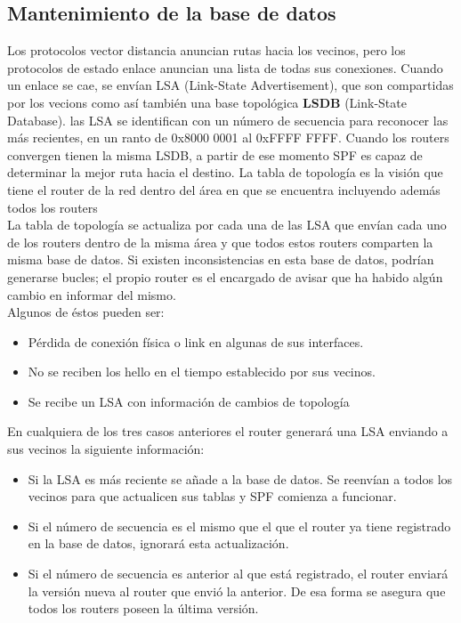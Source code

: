 \documentclass[12pt]{article}
\begin{document}
\subsection{Mantenimiento de la base de datos}
Los protocolos vector distancia anuncian rutas hacia los vecinos, pero los protocolos de estado enlace anuncian una lista de todas sus conexiones. Cuando un enlace se cae, se envían LSA (Link-State Advertisement), que son compartidas por los vecions como así también una base topológica \textbf{LSDB} (Link-State Database).  las LSA se identifican con un número de secuencia para reconocer las más recientes, en un ranto de 0x8000 0001 al 0xFFFF FFFF. Cuando los routers convergen tienen la misma LSDB, a partir de ese momento SPF es capaz de determinar la mejor ruta hacia el destino. La tabla de topología es la visión que tiene el router de la red dentro del área en que se encuentra incluyendo además todos los routers\\

La tabla de topología se actualiza por cada una de las LSA que envían cada uno de los routers dentro de la misma área y que todos estos routers comparten la misma base de datos. Si existen inconsistencias en esta base de datos, podrían generarse bucles; el propio router es el encargado de avisar que ha habido algún cambio en informar del mismo.\\

Algunos de éstos pueden ser:
\begin{itemize}
\item Pérdida de conexión física o link en algunas de sus interfaces.
\item No se reciben los hello en el tiempo establecido por sus vecinos.
\item Se recibe un LSA con información de cambios de topología
\end{itemize}

En cualquiera de los tres casos anteriores el router generará una LSA enviando a sus vecinos la siguiente información:
\begin{itemize}
\item Si la LSA es más reciente se añade a la base de datos. Se reenvían a todos los vecinos para que actualicen sus tablas y SPF comienza a funcionar.
\item Si el número de secuencia es el mismo que el que el router ya tiene registrado en la base de datos, ignorará esta actualización.
\item Si el número de secuencia es anterior al que está registrado, el router enviará la versión nueva al router que envió la anterior. De esa forma se asegura que todos los routers poseen la última versión.
\end{itemize}
\end{document}
